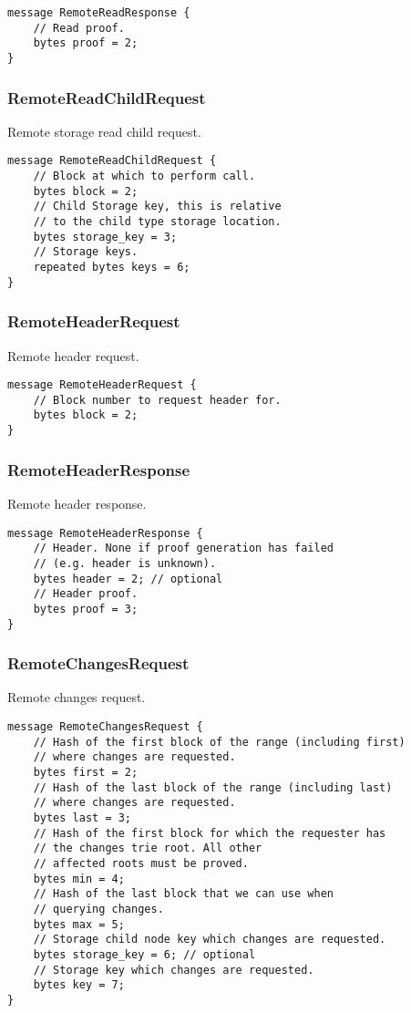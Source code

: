 \documentclass{book}
\begin{document}
\begin{lstlisting}[frame=single]
message RemoteReadResponse {
    // Read proof.
    bytes proof = 2;
}
\end{lstlisting}

\subsubsection{RemoteReadChildRequest}

Remote storage read child request.

\begin{lstlisting}[frame=single]
message RemoteReadChildRequest {
    // Block at which to perform call.
    bytes block = 2;
    // Child Storage key, this is relative
    // to the child type storage location.
    bytes storage_key = 3;
    // Storage keys.
    repeated bytes keys = 6;
}
\end{lstlisting}

\subsubsection{RemoteHeaderRequest}

Remote header request.

\begin{lstlisting}[frame=single]
message RemoteHeaderRequest {
    // Block number to request header for.
    bytes block = 2;
}
\end{lstlisting}

\subsubsection{RemoteHeaderResponse}

Remote header response.

\begin{lstlisting}[frame=single]
message RemoteHeaderResponse {
    // Header. None if proof generation has failed
    // (e.g. header is unknown).
    bytes header = 2; // optional
    // Header proof.
    bytes proof = 3;
}
\end{lstlisting}

\subsubsection{RemoteChangesRequest}

Remote changes request.

\begin{lstlisting}[frame=single]
message RemoteChangesRequest {
    // Hash of the first block of the range (including first)
    // where changes are requested.
    bytes first = 2;
    // Hash of the last block of the range (including last)
    // where changes are requested.
    bytes last = 3;
    // Hash of the first block for which the requester has
    // the changes trie root. All other
    // affected roots must be proved.
    bytes min = 4;
    // Hash of the last block that we can use when
    // querying changes.
    bytes max = 5;
    // Storage child node key which changes are requested.
    bytes storage_key = 6; // optional
    // Storage key which changes are requested.
    bytes key = 7;
}
\end{lstlisting}
\end{document}
